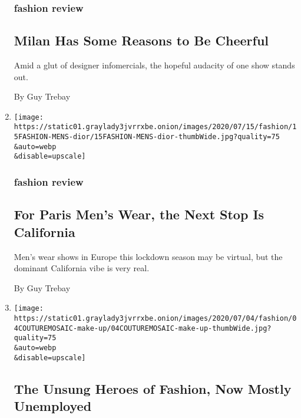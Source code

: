 \begin{enumerate}
  \hypertarget{fashion-review}{%
  \subsubsection{fashion review}\label{fashion-review}}

  \hypertarget{milan-has-some-reasons-to-be-cheerful}{%
  \subsection{Milan Has Some Reasons to Be
  Cheerful}\label{milan-has-some-reasons-to-be-cheerful}}

  Amid a glut of designer infomercials, the hopeful audacity of one show
  stands out.

  By Guy Trebay
\item
  \href{/2020/07/15/style/mens-fashion-for-paris-mens-wear-next-stop-california.html}{}

  \texttt{[image: https://static01.graylady3jvrrxbe.onion/images/2020/07/15/fashion/15FASHION-MENS-dior/15FASHION-MENS-dior-thumbWide.jpg?quality=75\\\&auto=webp\\\&disable=upscale]}

  \hypertarget{fashion-review-1}{%
  \subsubsection{fashion review}\label{fashion-review-1}}

  \hypertarget{for-paris-mens-wear-the-next-stop-is-california}{%
  \subsection{For Paris Men's Wear, the Next Stop Is
  California}\label{for-paris-mens-wear-the-next-stop-is-california}}

  Men's wear shows in Europe this lockdown season may be virtual, but
  the dominant California vibe is very real.

  By Guy Trebay
\item
  \href{/2020/07/04/style/couture-workers-fashion-coronavirus.html}{}

  \texttt{[image: https://static01.graylady3jvrrxbe.onion/images/2020/07/04/fashion/04COUTUREMOSAIC-make-up/04COUTUREMOSAIC-make-up-thumbWide.jpg?quality=75\\\&auto=webp\\\&disable=upscale]}

  \hypertarget{the-unsung-heroes-of-fashion-now-mostly-unemployed}{%
  \subsection{The Unsung Heroes of Fashion, Now Mostly
  Unemployed}\label{the-unsung-heroes-of-fashion-now-mostly-unemployed}}


\end{enumerate}
